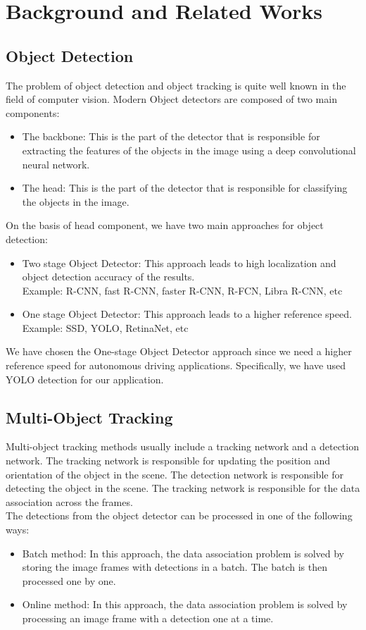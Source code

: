 \documentclass[conference]{IEEEtran}
\begin{document}
\section{Background and Related Works}
\subsection{Object Detection}
The problem of object detection and object tracking is quite well known in the field of computer vision. Modern Object detectors are composed of two main components:
\begin{itemize}
  \item The backbone: This is the part of the detector that is responsible for extracting the features of the objects in the image using a deep convolutional neural network.
  \item The head: This is the part of the detector that is responsible for classifying the objects in the image.
\end{itemize}

On the basis of head component, we have two main approaches for object detection:
\begin{itemize}
  \item Two stage Object Detector: This approach leads to high localization and object detection accuracy of the results. \\
        Example: R-CNN, fast R-CNN, faster R-CNN, R-FCN, Libra R-CNN, etc
  \item One stage Object Detector: This approach leads to a higher reference speed. \\
        Example: SSD, YOLO, RetinaNet, etc
\end{itemize}

We have chosen the One-stage Object Detector approach since we need a higher reference speed for autonomous driving applications. Specifically, we have used YOLO detection for our application.

\subsection{Multi-Object Tracking}
Multi-object tracking methods usually include a tracking network and a detection network. The tracking network is responsible for updating the position and orientation of the object in the scene. The detection network is responsible for detecting the object in the scene. The tracking network is responsible for the data association across the frames.  \\
The detections from the object detector can be processed in one of the following ways:
\begin{itemize}
  \item Batch method: In this approach, the data association problem is solved by storing the image frames with detections in a batch. The batch is then processed one by one. \\
  \item Online method: In this approach, the data association problem is solved by processing an image frame with a detection one at a time. \\
\end{itemize}
\end{document}
